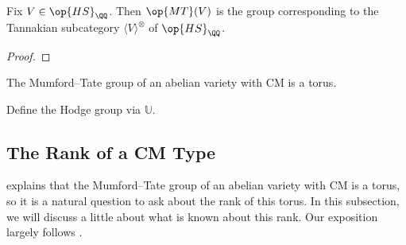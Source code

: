 \documentclass{article}
\begin{document}
\begin{corollary}
	Fix $V\in\op{HS}_\QQ$. Then $\op{MT}(V)$ is the group corresponding to the Tannakian subcategory $\langle V\rangle^{\otimes}$ of $\op{HS}_\QQ$.
\end{corollary}
\begin{proof}
	\todo{}
\end{proof}
\begin{proposition} \label{prop:mt-cm-torus}
	The Mumford--Tate group of an abelian variety with CM is a torus.
\end{proposition}
Define the Hodge group via $\mathbb U$.\todo{}

\subsection{The Rank of a CM Type}
 explains that the Mumford--Tate group of an abelian variety with CM is a torus, so it is a natural question to ask about the rank of this torus. In this subsection, we will discuss a little about what is known about this rank. Our exposition largely follows \cite[Section~6.1]{lang-cm}.
\end{document}

